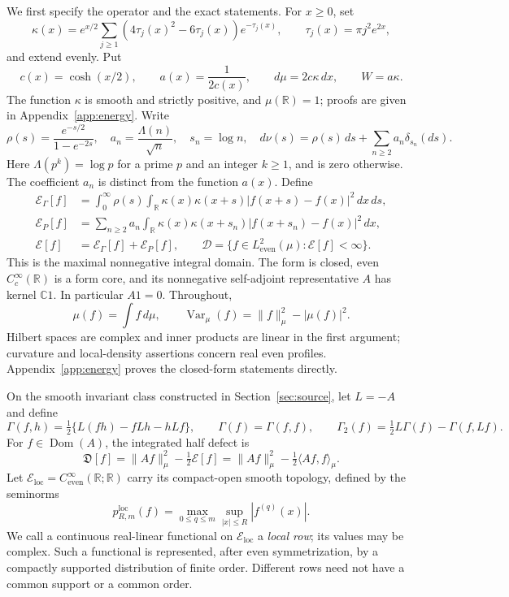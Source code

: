 \documentclass[11pt,a4paper]{article}
\numberwithin{equation}{section}
\theoremstyle{definition}
\theoremstyle{remark}
\newcommand{\R}{\mathbb R}
\newcommand{\C}{\mathbb C}
\newcommand{\E}{\mathcal E}
\newcommand{\D}{\mathcal D}
\newcommand{\He}{L^2_{\mathrm{even}}(\mu)}
\newcommand{\dom}{\operatorname{Dom}}
\newcommand{\Var}{\operatorname{Var}}
\newcommand{\ip}[2]{\langle #1,#2\rangle}
\newcommand{\norm}[1]{\lVert #1\rVert}
\newcommand{\Eloc}{\mathcal E_{\mathrm{loc}}}
\newcommand{\Def}{\mathfrak D}
\begin{document}
We first specify the operator and the exact statements. For $x\ge0$, set
\begin{equation}\label{eq:kappa}
 \kappa(x)=e^{x/2}\sum_{j\ge1}(4\tau_j(x)^2-6\tau_j(x))e^{-\tau_j(x)},
 \qquad \tau_j(x)=\pi j^2e^{2x},
\end{equation}
and extend evenly. Put
\begin{equation}\label{eq:weights}
 c(x)=\cosh(x/2),\qquad a(x)=\frac1{2c(x)},\qquad
 d\mu=2c\kappa\,dx,\qquad W=a\kappa.
\end{equation}
The function $\kappa$ is smooth and strictly positive, and $\mu(\R)=1$; proofs are given in Appendix~\ref{app:energy}. Write
\begin{equation}\label{eq:nu}
 \rho(s)=\frac{e^{-s/2}}{1-e^{-2s}},\quad
 a_n=\frac{\Lambda(n)}{\sqrt n},\quad s_n=\log n,\quad
 d\nu(s)=\rho(s)\,ds+\sum_{n\ge2}a_n\delta_{s_n}(ds).
\end{equation}
Here $\Lambda(p^k)=\log p$ for a prime $p$ and an integer $k\ge1$, and is zero otherwise. The coefficient $a_n$ is distinct from the function $a(x)$. Define
\begin{align}
 \E_\Gamma[f]&=\int_0^\infty\rho(s)\int_\R
  \kappa(x)\kappa(x+s)|f(x+s)-f(x)|^2\,dx\,ds,\label{eq:Eg}\\
 \E_P[f]&=\sum_{n\ge2}a_n\int_\R
  \kappa(x)\kappa(x+s_n)|f(x+s_n)-f(x)|^2\,dx,\label{eq:Ep}\\
 \E[f]&=\E_\Gamma[f]+\E_P[f],\qquad
 \D=\{f\in\He:\E[f]<\infty\}.\label{eq:Edomain}
\end{align}
This is the maximal nonnegative integral domain. The form is closed, even $C_c^\infty(\R)$ is a form core, and its nonnegative self-adjoint representative $A$ has kernel $\C1$. In particular $A1=0$. Throughout,
\[
 \mu(f)=\int f\,d\mu,\qquad
 \Var_\mu(f)=\norm{f}_\mu^2-|\mu(f)|^2.
\]
Hilbert spaces are complex and inner products are linear in the first argument; curvature and local-density assertions concern real even profiles. Appendix~\ref{app:energy} proves the closed-form statements directly.

On the smooth invariant class constructed in Section~\ref{sec:source}, let $L=-A$ and define
\begin{equation}\label{eq:carredef}
 \Gamma(f,h)=\tfrac12\{L(fh)-fLh-hLf\},\qquad
 \Gamma(f)=\Gamma(f,f),\qquad
 \Gamma_2(f)=\tfrac12L\Gamma(f)-\Gamma(f,Lf).
\end{equation}
For $f\in\dom(A)$, the integrated half defect is
\begin{equation}\label{eq:defect}
 \Def[f]=\norm{Af}_\mu^2-\tfrac12\E[f]
        =\norm{Af}_\mu^2-\tfrac12\ip{Af}{f}_\mu.
\end{equation}
Let $\Eloc=C^\infty_{\mathrm{even}}(\R;\R)$ carry its compact-open smooth topology, defined by the seminorms
\begin{equation}\label{eq:localtopology}
 p^{\mathrm{loc}}_{R,m}(f)=\max_{0\le q\le m}\sup_{|x|\le R}|f^{(q)}(x)|.
\end{equation}
We call a continuous real-linear functional on $\Eloc$ a \emph{local row}; its values may be complex. Such a functional is represented, after even symmetrization, by a compactly supported distribution of finite order. Different rows need not have a common support or a common order.
\end{document}
